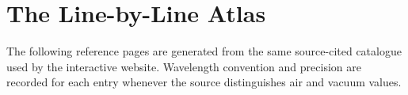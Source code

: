 \chapter{The Line-by-Line Atlas}
\label{chap:atlas}

The following reference pages are generated from the same source-cited
catalogue used by the interactive website. Wavelength convention and precision
are recorded for each entry whenever the source distinguishes air and vacuum
values.

